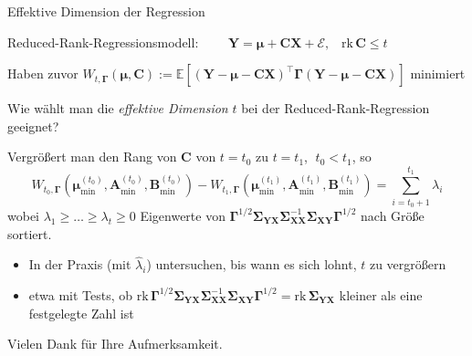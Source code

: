 \documentclass[12pt, aspectratio=169]{beamer}
\newcommand{\E}{\mathbb{E}}
\newcommand{\X}{\mathbf{X}}
\newcommand{\Y}{\mathbf{Y}}
\newcommand{\muu}{\bm{\mu}}
\newcommand{\Ssigma}{\bm{\Sigma}}
\newcommand{\C}{\mathbf{C}}
\newcommand{\rk}{\mathrm{rk}}
\newcommand{\A}{\mathbf{A}}
\newcommand{\B}{\mathbf{B}}
\newcommand{\Ggamma}{\bm{\Gamma}}
\begin{document}
\begin{frame}{Effektive Dimension der Regression}
\begin{alertblock}{}
	\begin{center}
		Reduced-Rank-Regressionsmodell: $ \qquad \Y = \muu + \C \X + \mathcal{E}\text{,} \quad  \rk \,\C \leq t $
	\end{center}
\end{alertblock}
\begin{alertblock}{}
	\begin{center}
		Haben zuvor $ W_{t, \Ggamma}(\muu, \C) := \E[(\Y - \muu - \C \X)^{\top} \Ggamma (\Y - \muu - \C \X)]$ minimiert
	\end{center}
\end{alertblock}
	Wie wählt man die \textit{effektive Dimension} $t$ bei der Reduced-Rank-Regression geeignet? 
	
	Vergrößert man den Rang von $\C$ von $t = t_0$ zu $t = t_1$, $\; t_0 < t_1$, so
	$$W_{t_0, \Ggamma}(\muu^{(t_0)}_{\min}, \A^{(t_0)}_{\min}, \B^{(t_0)}_{\min}) - W_{t_1, \Ggamma}(\muu^{(t_1)}_{\min}, \A^{(t_1)}_{\min}, \B^{(t_1)}_{\min}) = \sum_{i=t_0+1}^{t_1} \lambda_i$$
	wobei $\lambda_1 \geq \dots \geq \lambda_t \geq 0$ Eigenwerte von $\Ggamma^{1/2} \Ssigma_{\Y\X} \Ssigma_{\X\X}^{-1} \Ssigma_{\X\Y} \Ggamma^{1/2}$ nach Größe sortiert.
	
	\begin{itemize}
		\item In der Praxis (mit $\widehat{\lambda}_i$) untersuchen, bis wann es sich \glqq lohnt\grqq , $t$ zu vergrößern
		\item etwa mit Tests, ob $\rk \, \Ggamma^{1/2} \Ssigma_{\Y\X} \Ssigma_{\X\X}^{-1} \Ssigma_{\X\Y} \Ggamma^{1/2} = \rk \, \Ssigma_{\Y\X}$ kleiner als eine festgelegte Zahl ist
	\end{itemize}
\end{frame}

\begin{frame}
	\begin{center}
		\large Vielen Dank für Ihre Aufmerksamkeit.
	\end{center}
\end{frame}
\end{document}
